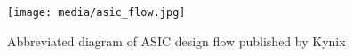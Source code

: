 
\begin{figure}[t]
    \centering
    \texttt{[image: media/asic\_flow.jpg]}
    \caption{Abbreviated diagram of ASIC design flow published by Kynix \cite{kynixDesignFlow}}
    \label{fig:asic_flow}
\end{figure}

